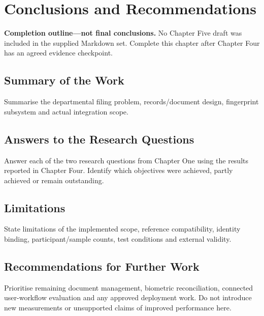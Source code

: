 \chapter{Conclusions and Recommendations}\label{chap:5}
\textbf{Completion outline---not final conclusions.} No Chapter Five draft was
included in the supplied Markdown set. Complete this chapter after Chapter Four
has an agreed evidence checkpoint.
\section{Summary of the Work}
Summarise the departmental filing problem, records/document design, fingerprint
subsystem and actual integration scope.
\section{Answers to the Research Questions}
Answer each of the two research questions from Chapter One using the results
reported in Chapter Four. Identify which objectives were achieved, partly
achieved or remain outstanding.
\section{Limitations}
State limitations of the implemented scope, reference compatibility, identity
binding, participant/sample counts, test conditions and external validity.
\section{Recommendations for Further Work}
Prioritise remaining document management, biometric reconciliation, connected
user-workflow evaluation and any approved deployment work. Do not introduce
new measurements or unsupported claims of improved performance here.

